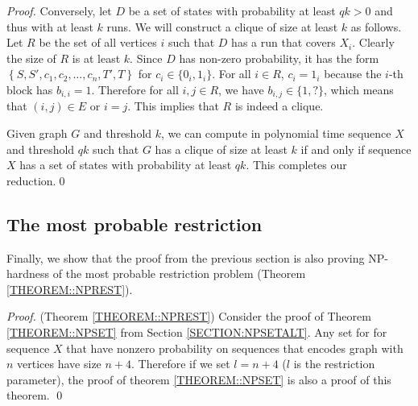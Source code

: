 \begin{proof}
Conversely, let $D$ be a set of states with probability at least $qk>0$
and thus with at least $k$ runs. We will construct a clique of size at least $k$
as follows. Let $R$ be the set of all vertices $i$ such that $D$ has a run that
covers $X_i$. Clearly the size of $R$ is at least $k$.  Since $D$ has non-zero
probability, it has the form $\left\{S,S',c_1,c_2,\dots,c_n,T',T\right\}$ for
$c_i\in \{0_i,1_i\}$. For all $i\in R$, $c_i=1_i$ because the $i$-th block has
$b_{i,i}=1$. Therefore for all $i,j\in R$, we have $b_{i,j}\in \{1,?\}$, which
means that $(i,j)\in E$ or $i=j$. This implies that $R$ is indeed a clique.

Given graph $G$ and threshold $k$, we can compute in
polynomial time sequence $X$ and threshold $qk$ such that $G$ has a
clique of size at least $k$ if and only if sequence $X$ has a
set of states with probability at least $qk$. This completes our reduction.\qed
\end{proof}
\subsection{The most probable restriction}
Finally, we show that the proof from the previous section is also proving NP-hardness of
the most probable restriction problem (Theorem \ref{THEOREM::NPREST}).

\begin{proof}(Theorem \ref{THEOREM::NPREST})
Consider the proof of Theorem \ref{THEOREM::NPSET} from Section
\ref{SECTION:NPSETALT}.
Any set for for sequence $X$ that have nonzero probability on sequences that
encodes graph with $n$ vertices have size $n + 4$. Therefore if we set $l = n +
4$ ($l$ is the restriction parameter), the proof of theorem
\ref{THEOREM::NPSET} is also a proof of this theorem.  \qed
\end{proof}
